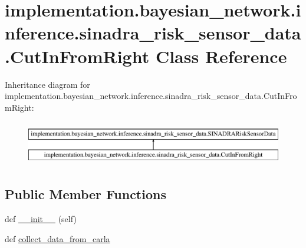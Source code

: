 \hypertarget{classimplementation_1_1bayesian__network_1_1inference_1_1sinadra__risk__sensor__data_1_1_cut_in_from_right}{}\section{implementation.\+bayesian\+\_\+network.\+inference.\+sinadra\+\_\+risk\+\_\+sensor\+\_\+data.\+Cut\+In\+From\+Right Class Reference}
\label{classimplementation_1_1bayesian__network_1_1inference_1_1sinadra__risk__sensor__data_1_1_cut_in_from_right}
Inheritance diagram for implementation.\+bayesian\+\_\+network.\+inference.\+sinadra\+\_\+risk\+\_\+sensor\+\_\+data.\+Cut\+In\+From\+Right\+:\begin{figure}[H]
\begin{center}
\leavevmode
\includegraphics[height=1.989343cm]{classimplementation_1_1bayesian__network_1_1inference_1_1sinadra__risk__sensor__data_1_1_cut_in_from_right}
\end{center}
\end{figure}
\subsection*{Public Member Functions}
\begin{DoxyCompactItemize}
\item 
def \hyperlink{classimplementation_1_1bayesian__network_1_1inference_1_1sinadra__risk__sensor__data_1_1_cut_in_from_right_ab25834a05e23120be3685719bf348155}{\+\_\+\+\_\+init\+\_\+\+\_\+} (self)
\item 
def \hyperlink{classimplementation_1_1bayesian__network_1_1inference_1_1sinadra__risk__sensor__data_1_1_cut_in_from_right_adeae6986decafe9a8ce41ee0dc67d160}{collect\+\_\+data\+\_\+from\+\_\+carla}
\end{DoxyCompactItemize}
